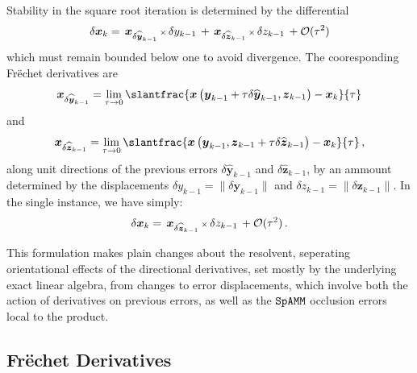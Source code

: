 \documentclass[letterpaper,twocolumn,amsmath,amsfont,amssymb,english,aps,jcp,preprintnumbers,groupaddress,nofootinbib,tightenlines,floatfix]{revtex4}
\newcommand{\mat}[1]{\boldsymbol{#1}}
\theoremstyle{plain}
\theoremstyle{remark}
\theoremstyle{plain}
\begin{document}
Stability in the square root iteration is determined  by the differential 
\begin{equation} \label{firstorderdual}
\delta \mat{x}_k = \,  { \mat{x}}_{\delta \widehat{\mat{y}}_{k-1}}  \, {\scriptstyle \times} \, \delta y_{k-1}
                 \, + \,  { \mat{x}}_{\delta \widehat{\mat{z}}_{k-1}}  \, {\scriptstyle \times} \, \delta z_{k-1}  \, + {\cal O}(\tau^2) 
\end{equation}
which must remain bounded below one to avoid divergence.   The cooresponding Fr\"{e}chet derivatives are
\begin{equation}
  \mat{x}_{\delta \widehat{ \mat{y}}_{k-1}}
= \lim_{\tau \rightarrow 0} \slantfrac{ \mat{x} \left( \mat{y}_{k-1} + \tau \delta \widehat{\mat{y}}_{k-1} ,  {\mat{z}}_{k-1}  \right)
                                     -\mat{x}_k    }{\tau} 
 \end{equation}
and
 \begin{equation}
 \mat{x}_{\delta \widehat{ \mat{z}}_{k-1}} = \lim_{\tau \rightarrow 0}
\slantfrac{ \mat{x} \left( {\mat{y}}_{k-1} , \mat{z}_{k-1} +\tau  \delta \widehat{\mat{z}}_{k-1} \right) - \mat{x}_k   }{\tau}  \, , 
 \end{equation}
along unit directions of the previous errors $\delta \widehat{\mat{y}}_{k-1}$ and $\delta \widehat{\mat{z}}_{k-1}$, by an ammount
determined by the displacements $\delta y_{k-1} = \lVert \delta \mat{y}_{k-1} \rVert$  and  $\delta z_{k-1}=\lVert \delta \mat{z}_{k-1} \rVert$.
In the single instance, we have simply:
\begin{equation} \label{firstordersingle}
\delta \mat{x}_k = \,  { \mat{x}}_{\delta \widehat{\mat{z}}_{k-1}}  \, {\scriptstyle \times} \, \delta z_{k-1}  \, + {\cal O}(\tau^2)  \, .
\end{equation}

This formulation makes plain changes about the resolvent, seperating orientational effects 
of the directional derivatives, set mostly by the underlying exact linear algebra, from 
changes to error displacements, which involve both the action of derivatives on previous errors,  as well as 
the $\tt SpAMM$ occlusion errors local to the product.


\subsection{Fr\"{e}chet Derivatives}
 
\end{document}
